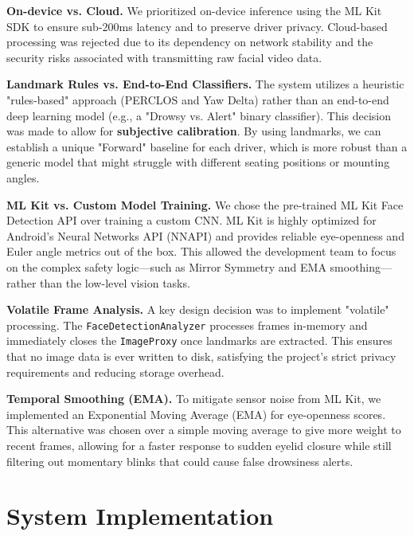 \documentclass[11pt]{report}
\begin{document}
\noindent\textbf{On-device vs. Cloud.}
We prioritized on-device inference using the ML Kit SDK to ensure sub-200ms latency and to preserve driver privacy. Cloud-based processing was rejected due to its dependency on network stability and the security risks associated with transmitting raw facial video data.

\vspace{1em}
\noindent\textbf{Landmark Rules vs. End-to-End Classifiers.}
The system utilizes a heuristic "rules-based" approach (PERCLOS and Yaw Delta) rather than an end-to-end deep learning model (e.g., a "Drowsy vs. Alert" binary classifier). This decision was made to allow for \textbf{subjective calibration}. By using landmarks, we can establish a unique "Forward" baseline for each driver, which is more robust than a generic model that might struggle with different seating positions or mounting angles.

\vspace{1em}
\noindent\textbf{ML Kit vs. Custom Model Training.}
We chose the pre-trained ML Kit Face Detection API over training a custom CNN. ML Kit is highly optimized for Android's Neural Networks API (NNAPI) and provides reliable eye-openness and Euler angle metrics out of the box. This allowed the development team to focus on the complex safety logic—such as Mirror Symmetry and EMA smoothing—rather than the low-level vision tasks.

\vspace{1em}
\noindent\textbf{Volatile Frame Analysis.}
A key design decision was to implement "volatile" processing. The \texttt{FaceDetectionAnalyzer} processes frames in-memory and immediately closes the \texttt{ImageProxy} once landmarks are extracted. This ensures that no image data is ever written to disk, satisfying the project's strict privacy requirements and reducing storage overhead.

\vspace{1em}
\noindent\textbf{Temporal Smoothing (EMA).}
To mitigate sensor noise from ML Kit, we implemented an Exponential Moving Average (EMA) for eye-openness scores. This alternative was chosen over a simple moving average to give more weight to recent frames, allowing for a faster response to sudden eyelid closure while still filtering out momentary blinks that could cause false drowsiness alerts.

\clearpage

\chapter{System Implementation}\label{ch:system-implementation}
\end{document}
